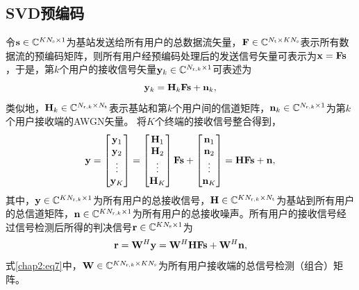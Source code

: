 \subsection{SVD预编码}
令${{\bf{s}} \in {\mathbb{C}^{K{N_{\rm{s}}} \times 1}}}$为基站发送给所有用户的总数据流矢量，${{\bf{F}} \in {\mathbb{C}^{{N_{\rm{t}}} \times K{N_{\rm{s}}}}}}$表示所有数据流的预编码矩阵，则所有用户经预编码处理后的发送信号矢量可表示为${{\bf{x}} = {\bf{F}}{\bf{s}}}$，于是，第${k}$个用户的接收信号矢量${{{\bf{y}}_k} \in {\mathbb{C}^{{N_{{\rm{r}},k}} \times 1}}}$可表述为
\begin{equation}\label{chap2:eq5}
  {{\bf{y}}_k} = {{\bf{H}}_k}{\bf{Fs}} + {{\bf{n}}_k},
\end{equation}
类似地，${{{\bf{H}}_k} \in {\mathbb{C}^{{N_{{\rm{r}},k}} \times {N_{\rm{t}}}}}}$表示基站和第${k}$个用户间的信道矩阵，${{\bf{n}}_k} \in {\mathbb{C}^{{N_{{\rm{r}},k}} \times 1}}$为第${k}$个用户接收端的AWGN矢量。
将${K}$个终端的接收信号整合得到，
\begin{equation}\label{chap2:eq6}
  {\bf{y}} = \begin{bmatrix}
               {{{\bf{y}}_1}} \\
               {{{\bf{y}}_2}} \\
               \vdots \\
               {{{\bf{y}}_K}}
             \end{bmatrix}
           = \begin{bmatrix}
                {{{\bf{H}}_1}}\\
                {{{\bf{H}}_2}}\\
                 \vdots \\
                {{{\bf{H}}_K}}
             \end{bmatrix}{\bf{Fs}} +
             \begin{bmatrix}
                {{{\bf{n}}_1}}\\
                {{{\bf{n}}_2}}\\
                 \vdots \\
                {{{\bf{n}}_K}}
             \end{bmatrix} = {\bf{HFs}} + {\bf{n}},
\end{equation}
其中，${{\bf{y}} \in {\mathbb{C}^{K{N_{{\rm{r}},k}} \times 1}}}$为所有用户的总接收信号，${\bf{H}} \in {\mathbb{C}^{K{N_{{\rm{r}},k}} \times {N_{\rm{t}}}}}$为基站到所有用户的总信道矩阵，${{\bf{n}} \in {\mathbb{C}^{K{N_{{\rm{r}},k}} \times 1}}}$为所有用户的总接收噪声。所有用户的接收信号经过信号检测后所得的判决信号${\bf{r}} \in {\mathbb{C}^{K{N_{\rm{s}}} \times 1}}$为
\begin{equation}\label{chap2:eq7}
  {\bf{r}} = {{\bf{W}}^H}{\bf{y}} = {{\bf{W}}^H}{\bf{HFs}} + {{\bf{W}}^H}{\bf{n}},
\end{equation}
式\eqref{chap2:eq7}中，${\bf{W}} \in {\mathbb{C}^{K{N_{{\rm{r}},k}} \times K{N_{\rm{s}}}}}$为所有用户接收端的总信号检测（组合）矩阵。


